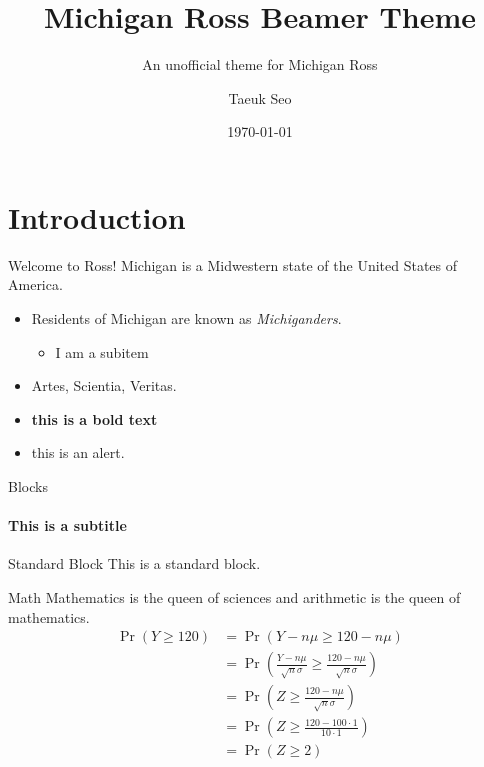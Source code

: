\documentclass[aspectratio=169]{beamer}
\author{Taeuk Seo}
\title{Michigan Ross Beamer Theme}
\subtitle{An unofficial theme for Michigan Ross}
\institute{Stephen M. Ross School of Business, University of Michigan}
\date{\today}
\begin{document}
	\begin{frame}[plain]
		\titlepage
	\end{frame}

\section{Introduction}
	
	\begin{frame}{Welcome to Ross!}
	Michigan is a Midwestern state of the United States of America. 
	\vfill
		\begin{itemize}
			\item Residents of Michigan are known as \emph{Michiganders}.
				\begin{itemize}
					\item I am a subitem
				\end{itemize}
			\item Artes, Scientia, Veritas.
			\item \textbf{this is a bold text}
			\item \alert{this is an alert}.
		\end{itemize}
	\end{frame}

	\begin{frame}{Blocks}
		\framesubtitle{This is a subtitle}
		\begin{block}{Standard Block}
			This is a standard block.
		\end{block}
	
	\end{frame}
	
	\begin{frame}{Math}
		Mathematics is the queen of sciences and arithmetic is the queen of mathematics.
		\begin{align*}
			\Pr(Y \geq 120) &= \Pr\left(Y-n\mu \geq 120-n\mu \right)\\
			&= \Pr\left( \frac{Y-n\mu }{\sqrt{n}\sigma} \geq \frac{120-n\mu }{\sqrt{n}\sigma} \right)\\
			&=\Pr\left( Z \geq \frac{120-n\mu }{\sqrt{n}\sigma} \right)\\
			&=\Pr\left( Z \geq \frac{120-100 \cdot 1 }{10 \cdot 1} \right)\\
			&=\Pr\left( Z \geq 2\right)
		\end{align*}
	\end{frame}
\end{document}
